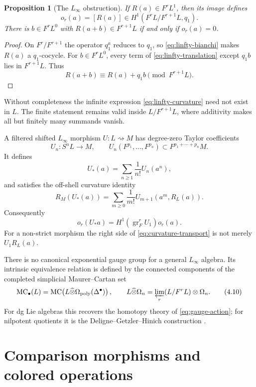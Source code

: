 \documentclass[11pt]{article}
\newtheorem{proposition}[theorem]{Proposition}
\theoremstyle{definition}
\theoremstyle{remark}
\newcommand{\MC}{\operatorname{MC}}
\newcommand{\gr}{\operatorname{gr}}
\begin{document}
\begin{proposition}[The $L_\infty$ obstruction]\label{prop:linfty-obstruction}
If $R(a)\in F^rL^1$, then its image defines
\[
 o_r(a)=[R(a)]\in H^1(F^rL/F^{r+1}L,q_1).
 \tag{4.7}\label{eq:shifted-obstruction}
\]
There is $b\in F^rL^0$ with $R(a+b)\in F^{r+1}L$ if and only if
$o_r(a)=0$.
\end{proposition}

\begin{proof}
On $F^r/F^{r+1}$ the operator $q_1^a$ reduces to $q_1$, so
\eqref{eq:linfty-bianchi} makes $R(a)$ a $q_1$-cocycle.  For
$b\in F^rL^0$, every term of \eqref{eq:linfty-translation} except
$q_1b$ lies in $F^{r+1}L$.  Thus
\[
 R(a+b)\equiv R(a)+q_1b\pmod {F^{r+1}L}.
\]
\end{proof}

Without completeness the infinite expression \eqref{eq:linfty-curvature}
need not exist in $L$.  The finite statement remains valid inside
$L/F^{r+1}L$, where additivity makes all but finitely many summands vanish.

A filtered shifted $L_\infty$ morphism $U:L\rightsquigarrow M$ has degree-zero
Taylor coefficients
\[
 U_n:S^nL\longrightarrow M,
 \qquad
 U_n(F^{p_1},\ldots,F^{p_n})\subset F^{p_1+\cdots+p_n}M.
\]
It defines
\[
 U_*(a)=\sum_{n\geq1}\frac1{n!}U_n(a^n),
\]
and satisfies the off-shell curvature identity
\[
 R_M(U_*(a))=
 \sum_{m\geq0}\frac1{m!}
 U_{m+1}(a^m,R_L(a)).
 \tag{4.8}\label{eq:curvature-transport}
\]
Consequently
\[
 o_r(U_*a)=H^1(\gr_F^rU_1)o_r(a).
 \tag{4.9}\label{eq:linfty-naturality}
\]
For a non-strict morphism the right side of
\eqref{eq:curvature-transport} is not merely $U_1R_L(a)$.

There is no canonical exponential gauge group for a general
$L_\infty$ algebra.  Its intrinsic equivalence relation is defined by the
connected components of the completed simplicial Maurer--Cartan set
\[
 \MC_\bullet(L)=
 \MC\!\left(L\widehat\otimes
 \Omega_{\mathrm{poly}}(\Delta^\bullet)\right),
 \qquad
 L\widehat\otimes\Omega_n
 =\varprojlim_r(L/F^rL)\otimes\Omega_n.
 \tag{4.10}\label{eq:mc-simplicial}
\]
For dg Lie algebras this recovers the homotopy theory of
\eqref{eq:gauge-action}; for nilpotent quotients it is the
Deligne--Getzler--Hinich construction \cite{Getzler}.

\section{Comparison morphisms and colored operations}
\end{document}
